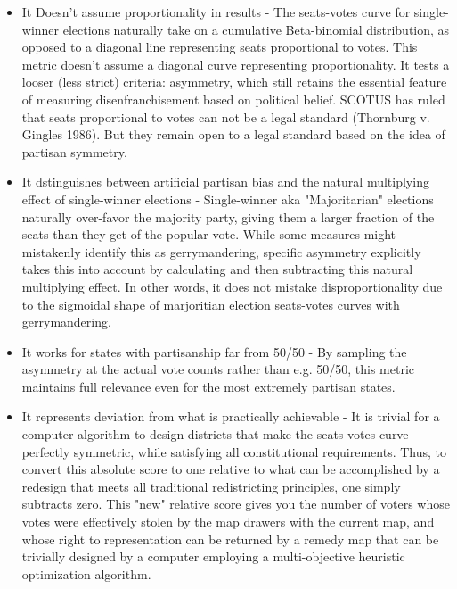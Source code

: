 \documentclass[preprint,12pt]{article}
\begin{document}
\begin{itemize}

\item It Doesn't assume proportionality in results - The seats-votes curve for single-winner elections naturally take on a cumulative Beta-binomial distribution, as opposed to a diagonal line representing seats proportional to votes.  This metric doesn't assume a diagonal curve representing proportionality.  It tests a looser (less strict) criteria: asymmetry, which still retains the essential feature of measuring disenfranchisement based on political belief.  SCOTUS has ruled that seats proportional to votes can not be a legal standard (Thornburg v. Gingles 1986).   But they remain open to a legal standard based on the idea of partisan symmetry.
 
\item It dstinguishes between artificial partisan bias and the natural multiplying effect of single-winner elections -  Single-winner aka "Majoritarian" elections naturally over-favor the majority party, giving them a larger fraction of the seats than they get of the popular vote.  
While some measures might mistakenly identify this as gerrymandering, specific asymmetry explicitly takes this into account by calculating and then subtracting this natural multiplying effect.
In other words, it does not mistake disproportionality due to the sigmoidal shape of marjoritian election seats-votes curves with gerrymandering.

\item It works for states with partisanship far from 50/50 - By sampling the asymmetry at the actual vote counts rather than e.g. 50/50, this metric maintains full relevance even for the most extremely partisan states.

\item It represents deviation from what is practically achievable - It is trivial for a computer algorithm to design districts that make the seats-votes curve perfectly symmetric, while satisfying all constitutional requirements.  
Thus, to convert this absolute score to one relative to what can be accomplished by a redesign that meets all traditional redistricting principles, one simply subtracts zero.  
This "new" relative score gives you the number of voters whose votes were effectively stolen by the map drawers with the current map, and whose right to representation can be returned by a remedy map that can be trivially designed by a computer employing a multi-objective heuristic optimization algorithm.


\end{itemize}
\end{document}
